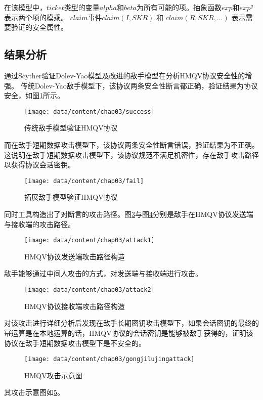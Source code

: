 	在该模型中，$ticket$类型的变量$alpha$和$beta$为所有可能的项。抽象函数$exp$和$exp^g$表示两个项的模乘。 $claim$事件$claim(I,SKR)$  和 $claim(R,SKR,\ldots)$ 表示需要验证的安全属性。
\subsection{结果分析}
通过Scyther验证Dolev-Yao模型及改进的敌手模型在分析HMQV协议安全性的增强。
传统Dolev-Yao敌手模型下，该协议两条安全性断言都正确，验证结果为协议安全，如图\ref{fig-dolev-yao}所示。
 \begin{figure}[htp]
	\centering
	\texttt{[image: data/content/chap03/success]}
	\caption{传统敌手模型验证HMQV协议}
	\label{fig-dolev-yao}
\end{figure}

	而在敌手短期数据攻击模型下，该协议两条安全性断言错误，验证结果为不正确。这说明在敌手短期数据攻击模型下，该协议规范不满足机密性，存在敌手攻击路径以获得协议会话密钥。
\begin{figure}[htp]
	\centering
	\texttt{[image: data/content/chap03/fail]}
	\caption{拓展敌手模型验证HMQV协议}
	\label{fig-gaijin}
\end{figure}

同时工具构造出了对断言的攻击路径。图\ref{fig-gongjifasong}与图\ref{fig-gongjijieshou}分别是敌手在HMQV协议发送端与接收端的攻击路径。
   \begin{figure}[htp]
	\centering
	\texttt{[image: data/content/chap03/attack1]}
	\caption{HMQV协议发送端攻击路径构造}
	\label{fig-gongjifasong}
\end{figure}

敌手能够通过中间人攻击的方式，对发送端与接收端进行攻击。
\begin{figure}[htp]
	\centering
	\texttt{[image: data/content/chap03/attack2]}
	\caption{HMQV协议接收端攻击路径构造}
	\label{fig-gongjijieshou}
\end{figure}



对该攻击进行详细分析后发现在敌手长期密钥攻击模型下，如果会话密钥的最终的幂运算是在本地运算的话，HMQV协议的会话密钥是能够被敌手获得的，证明该协议在敌手短期数据攻击模型下是不安全的。

\begin{figure}[htp]
	\centering
	\texttt{[image: data/content/chap03/gongjilujingattack]}
	\caption{HMQV攻击示意图}
	\label{fig-gongjilujing}
\end{figure}

其攻击示意图如\ref{fig-gongjilujing}。


